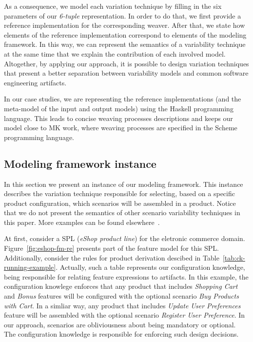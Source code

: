 \documentclass[times, 11pt,twocolumn]{article}
\begin{document}
As a consequence, we model each variation technique by filling in
the six parameters of our \emph{6-tuple} representation. In order to do
that, we first provide a reference implementation for the corresponding
weaver. After that, we state how elements of the reference implementation
correspond to elements of the modeling framework. In this way, we can represent the semantics
of a variability technique at the same time that we explain the contribution of each involved model. 
Altogether, by applying our approach, it is possible to design variation
techniques that present a better separation between variability models and
common software engineering artifacts.

In our case studies, we are representing the reference implementations (and the
meta-model of the input and output models) using the Haskell programming language. 
This leads to concise weaving processes descriptions and keeps our model close
to MK work, where weaving processes are specified in the Scheme programming language. 

\subsection{Modeling framework instance}\label{sub:framework-instance}

In this section we present an instance of our modeling framework. This
instance describes the variation technique responsible for selecting, based on a specific product
configuration, which scenarios will be assembled in a product.
Notice that we do not present the semantics of other scenario
variability techniques in this paper. More examples can be found
elsewhere~\cite{}.

At first, consider a SPL (\emph{eShop product line}) for the eletronic
commerce domain. Figure~\ref{fig:eshop-fm-re} presents part of the feature
model for this SPL. Additionally, consider the rules for product derivation descibed in
Table~\ref{tab:ck-running-example}. Actually, such a table
represents our configuration knowledge, being responsible for relating feature
expressions to artifacts. In this example, the configuration knowlege
enforces that any product that includes \emph{Shopping Cart} and
\emph{Bonus} features will be configured with the optional scenario \emph{Buy
Products with Cart}. In a simliar way, any product that includes \emph{Update
User Preferences} feature will be assembled with the optional scenario
\emph{Register User Preference}. In our approach, scenarios are obliviousness
about being mandatory or optional. The configuration knowledge is
responsible for enforcing such design decisions.
\end{document}
